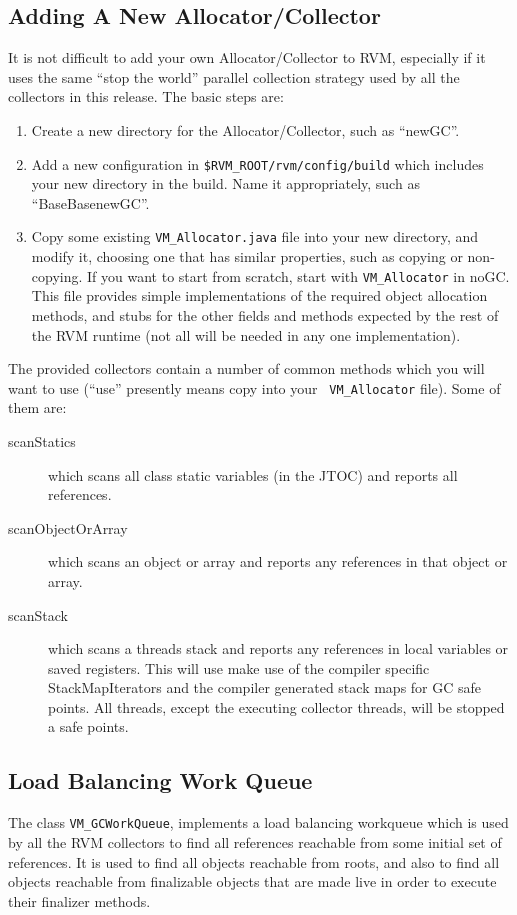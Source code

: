 \subsection{Adding A New Allocator/Collector} \label{sssec:newalloc}
It is not difficult to add your own Allocator/Collector to RVM,
especially if it uses the same ``stop the world'' parallel collection
strategy used by all the collectors in this release.  The basic steps
are:
\begin{enumerate}
\item Create a new directory for the Allocator/Collector, such as ``newGC''.
\item Add a new configuration in {\tt \$RVM\_ROOT/rvm/config/build}
which includes your new directory in the build.  Name it appropriately, such as
``BaseBasenewGC''.
\item Copy some existing {\tt VM\_Allocator.java} file into your new directory,
and modify it, choosing one that has similar properties, such as copying or
non-copying.  If you want to start from scratch, start with 
{\tt VM\_Allocator} in noGC.
This file provides simple implementations of the required object allocation
methods, and stubs for the other fields and methods expected by the rest
of the RVM runtime (not all will be needed in any one implementation).
\end{enumerate}

The provided collectors contain a number of common methods which you
will want to use (``use'' presently means copy into your {\tt
VM\_Allocator} file).
Some of them are:
\begin{description}
\item[scanStatics] which scans all class static variables (in the JTOC) and
reports all references.
\item[scanObjectOrArray] which scans an object or array and reports any references
in that object or array.
\item[scanStack] which scans a threads stack and reports any references in
local variables or saved registers.  This will use make use of the compiler
specific StackMapIterators and the compiler generated stack maps for GC safe points.
All threads, except the executing collector threads, will be stopped a safe points.
\end{description}

\subsection{Load Balancing Work Queue} \label{sssec:workqueue}
The class {\tt VM\_GCWorkQueue}, implements a load balancing workqueue
which is used by all the RVM collectors to find all references reachable from
some initial set of references.  It is used to find all objects reachable
from roots, and also to find all objects reachable from finalizable objects
that are made live in order to execute their finalizer methods.

